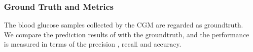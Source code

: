 \subsubsection{Ground Truth and Metrics}

The blood glucose samples collected by the CGM are regarded as groundtruth. We compare the prediction results of \sysname with the groundtruth, and the performance is measured in terms of the precision \cite{}, recall\cite{} and accuracy\cite{}.






%
%















